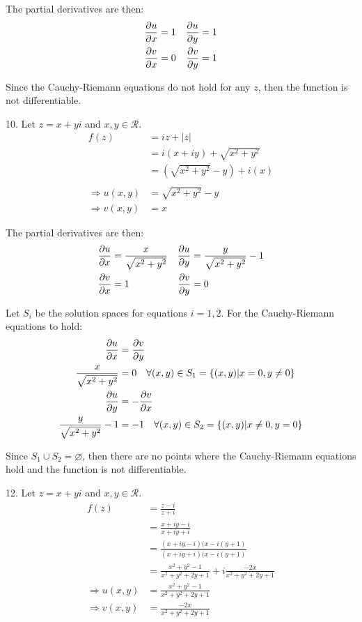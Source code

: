 \documentclass[11pt]{homework}
\begin{document}
The partial derivatives are then:
\begin{align*}
  \pdv{u}{x} &= 1    & \pdv{u}{y} &= 1 \\
  \pdv{v}{x} &= 0  & \pdv{v}{y} &= 1 
\end{align*}

Since the Cauchy-Riemann equations do not 
hold for any $z$, then the function
is not differentiable.

10.
Let $z = x+yi$ and $x,y \in \mathcal{R}$.
\begin{align*}
  f(z) &= iz + |z| \\
  &= i(x+iy) + \sqrt{x^2 + y^2} \\
  &= (\sqrt{x^2 + y^2} -y) + i(x) \\
      \\
\Rightarrow
  u(x,y) &=\sqrt{x^2 + y^2} -y  \\
\Rightarrow
  v(x,y) &=x
\end{align*}

The partial derivatives are then:
\begin{align*}
  \pdv{u}{x} &= \frac{x}{\sqrt{x^2 +y^2}}    & \pdv{u}{y} &= \frac{y}{\sqrt{x^2+y^2}} - 1 \\
  \pdv{v}{x} &= 1  & \pdv{v}{y} &= 0
\end{align*}

Let $S_i$ be the solution spaces for equations
$i=1,2$.
For the Cauchy-Riemann equations to hold:
\begin{align*}
  \pdv{u}{x} &= \pdv{v}{y} \\
  \frac{x}{\sqrt{x^2+y^2}} &= 0 \quad \forall (x,y)\in S_1=\{(x,y)|x=0,y\neq0\} \\
  \pdv{u}{y} &= -\pdv{v}{x} \\
  \frac{y}{\sqrt{x^2+y^2}} -1 &= -1  \quad \forall (x,y)\in S_2=\{(x,y)| x\neq 0,y=0\}
\end{align*}

Since $S_1 \cup S_2 = \varnothing$, then there are no points
where the Cauchy-Riemann equations hold and the 
function is not differentiable.

12.
Let $z = x+yi$ and $x,y \in \mathcal{R}$.
\begin{align*}
  f(z) &= \frac{z-i}{z+i} \\
    &= \frac{x+iy-i}{x+iy+i} \\
    &= \frac{(x+iy-i)(x-i(y+1)}{(x+iy+i)(x-i(y+1)} \\
    &= \frac{x^2 + y^2 -1}{x^2+y^2+2y+1} + i \frac{-2x}{x^2+y^2+2y+1}
      \\
\Rightarrow
  u(x,y) &=\frac{x^2 + y^2 -1}{x^2+y^2+2y+1}  \\
\Rightarrow
  v(x,y) &=\frac{-2x}{x^2+y^2+2y+1}
\end{align*}
\end{document}
